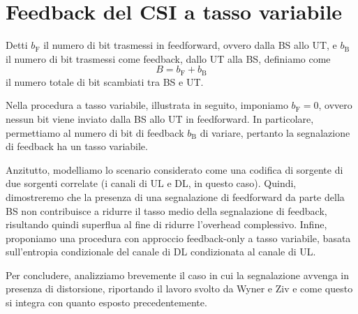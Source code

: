 \chapter{Feedback del CSI a tasso variabile}

\thispagestyle{empty}

Detti \(b_\mathrm{F}\) il numero di bit trasmessi in feedforward, ovvero dalla
BS allo UT, e \(b_\mathrm{B}\) il numero di bit trasmessi come feedback, dallo
UT alla BS, definiamo come
\[
    B = b_\mathrm{F} + b_\mathrm{B}
\]
il numero totale di bit scambiati tra BS e UT.

Nella procedura a tasso variabile, illustrata in seguito, imponiamo
\(b_\mathrm{F} = 0\), ovvero nessun bit viene inviato dalla BS allo UT in
feedforward. In particolare, permettiamo al numero di bit di feedback
\(b_\mathrm{B}\) di variare, pertanto la segnalazione di feedback ha un tasso
variabile.

Anzitutto, modelliamo lo scenario considerato come una codifica di sorgente di
due sorgenti correlate (i canali di UL e DL, in questo caso). Quindi,
dimostreremo che la presenza di una segnalazione di feedforward da parte della
BS non contribuisce a ridurre il tasso medio della segnalazione di feedback,
risultando quindi superflua al fine di ridurre l'overhead complessivo. Infine,
proponiamo una procedura con approccio feedback-only a tasso variabile, basata
sull'entropia condizionale del canale di DL condizionata al canale di UL.

Per concludere, analizziamo brevemente il caso in cui la segnalazione avvenga
in presenza di distorsione, riportando il lavoro svolto da Wyner e Ziv
\cite{1055508} e come questo si integra con quanto esposto precedentemente.









